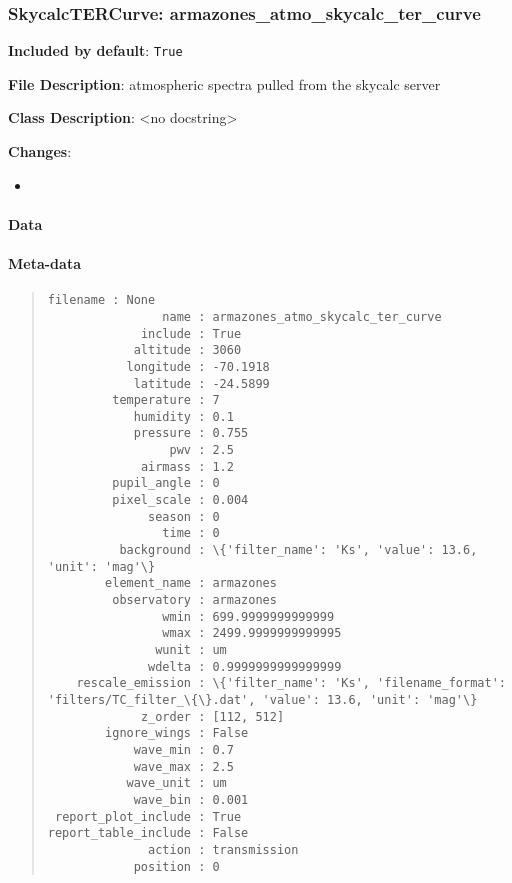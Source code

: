 \subsubsection{SkycalcTERCurve: \textquotedbl{}armazones\_atmo\_skycalc\_ter\_curve\textquotedbl{}%
  \label{skycalctercurve-armazones-atmo-skycalc-ter-curve}%
}

\textbf{Included by default}: \texttt{True}

\textbf{File Description}: atmospheric spectra pulled from the skycalc server

\textbf{Class Description}: <no docstring>

\textbf{Changes}:

\begin{itemize}
\item \end{itemize}


\paragraph{Data%
  \label{data}%
}

\begin{figure}[H]
\noindent{}\label{fig-armazones-atmo-skycalc-ter-curve}
\end{figure}


\paragraph{Meta-data%
  \label{meta-data}%
}

\begin{quote}
\begin{alltt}
\begin{lstlisting}[frame=single]
            filename : None
                name : armazones_atmo_skycalc_ter_curve
             include : True
            altitude : 3060
           longitude : -70.1918
            latitude : -24.5899
         temperature : 7
            humidity : 0.1
            pressure : 0.755
                 pwv : 2.5
             airmass : 1.2
         pupil_angle : 0
         pixel_scale : 0.004
              season : 0
                time : 0
          background : \{'filter_name': 'Ks', 'value': 13.6, 'unit': 'mag'\}
        element_name : armazones
         observatory : armazones
                wmin : 699.9999999999999
                wmax : 2499.9999999999995
               wunit : um
              wdelta : 0.9999999999999999
    rescale_emission : \{'filter_name': 'Ks', 'filename_format': 'filters/TC_filter_\{\}.dat', 'value': 13.6, 'unit': 'mag'\}
             z_order : [112, 512]
        ignore_wings : False
            wave_min : 0.7
            wave_max : 2.5
           wave_unit : um
            wave_bin : 0.001
 report_plot_include : True
report_table_include : False
              action : transmission
            position : 0
\end{lstlisting}
\end{alltt}
\end{quote}
